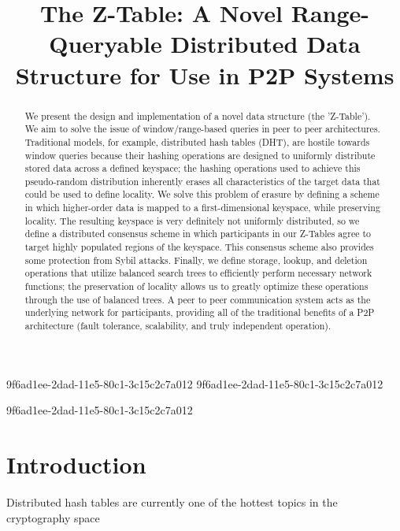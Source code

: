 \documentclass[12pt]{article}
\title{The Z-Table: A Novel Range-Queryable Distributed Data Structure for Use in P2P Systems}
\begin{document}
\maketitle
9f6ad1ee-2dad-11e5-80c1-3c15c2c7a012
9f6ad1ee-2dad-11e5-80c1-3c15c2c7a012\begin{abstract}
We present the design and implementation of a novel data structure (the 'Z-Table'). We aim to solve the issue of window/range-based queries in peer to peer architectures. Traditional models, for example,  distributed hash tables (DHT), are hostile towards window queries because their hashing operations are designed to uniformly distribute stored data across a defined keyspace; the hashing operations used to achieve this pseudo-random distribution inherently erases all characteristics of the target data that could be used to define locality. We solve this problem of erasure by defining a scheme in which higher-order data is mapped to a first-dimensional keyspace, while preserving locality. The resulting keyspace is very definitely not uniformly distributed, so we define a distributed consensus scheme in which participants in our Z-Tables agree to target highly populated regions of the keyspace. This consensus scheme also provides some protection from Sybil attacks. Finally, we define storage, lookup, and deletion operations that utilize balanced search trees to efficiently perform necessary network functions; the preservation of locality allows us to greatly optimize these operations through the use of balanced trees. A peer to peer communication system acts as the underlying network for participants, providing all of the traditional benefits of a P2P architecture (fault tolerance, scalability, and truly independent operation).
\end{abstract}


\newpage
9f6ad1ee-2dad-11e5-80c1-3c15c2c7a012\section{Introduction}
Distributed hash tables are currently one of the hottest topics in the cryptography space~\cite{Stoica:2001dj,Rowstron:2001ea,Ratnasamy:2001wn}

\printbibliography
\end{document}
